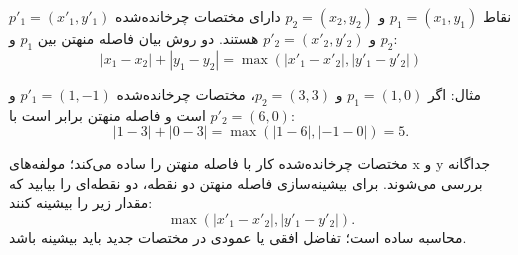 نقاط $p_1=(x_1,y_1)$ و $p_2=(x_2,y_2)$ دارای مختصات چرخانده‌شده $p'_1=(x'_1,y'_1)$ و $p'_2=(x'_2,y'_2)$ هستند.
دو روش بیان فاصله منهتن بین $p_1$ و $p_2$:
\[|x_1-x_2|+|y_1-y_2| = \max(|x'_1-x'_2|,|y'_1-y'_2|)\]

مثال: اگر $p_1=(1,0)$ و $p_2=(3,3)$،
مختصات چرخانده‌شده $p'_1=(1,-1)$ و $p'_2=(6,0)$ است
و فاصله منهتن برابر است با:
\[|1-3|+|0-3| = \max(|1-6|,|-1-0|) = 5.\]

مختصات چرخانده‌شده کار با فاصله منهتن را ساده می‌کند؛ مولفه‌های x و y جداگانه بررسی می‌شوند.
برای بیشینه‌سازی فاصله منهتن دو نقطه، دو نقطه‌ای را بیابید که مقدار زیر را بیشینه کنند:
\[\max(|x'_1-x'_2|,|y'_1-y'_2|).\]
محاسبه ساده است؛ تفاضل افقی یا عمودی در مختصات جدید باید بیشینه باشد.